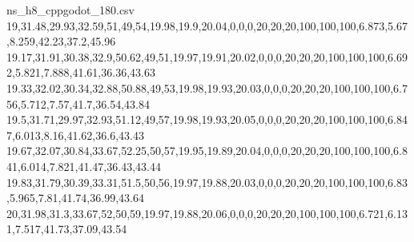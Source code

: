 \begin{filecontents*}[overwrite]{ns_h8_cppgodot_180.csv}
19,31.48,29.93,32.59,51,49,54,19.98,19.9,20.04,0,0,0,20,20,20,100,100,100,6.873,5.67,8.259,42.23,37.2,45.96
19.17,31.91,30.38,32.9,50.62,49,51,19.97,19.91,20.02,0,0,0,20,20,20,100,100,100,6.692,5.821,7.888,41.61,36.36,43.63
19.33,32.02,30.34,32.88,50.88,49,53,19.98,19.93,20.03,0,0,0,20,20,20,100,100,100,6.756,5.712,7.57,41.7,36.54,43.84
19.5,31.71,29.97,32.93,51.12,49,57,19.98,19.93,20.05,0,0,0,20,20,20,100,100,100,6.847,6.013,8.16,41.62,36.6,43.43
19.67,32.07,30.84,33.67,52.25,50,57,19.95,19.89,20.04,0,0,0,20,20,20,100,100,100,6.841,6.014,7.821,41.47,36.43,43.44
19.83,31.79,30.39,33.31,51.5,50,56,19.97,19.88,20.03,0,0,0,20,20,20,100,100,100,6.83,5.965,7.81,41.74,36.99,43.64
20,31.98,31.3,33.67,52,50,59,19.97,19.88,20.06,0,0,0,20,20,20,100,100,100,6.721,6.131,7.517,41.73,37.09,43.54
\end{filecontents*}

